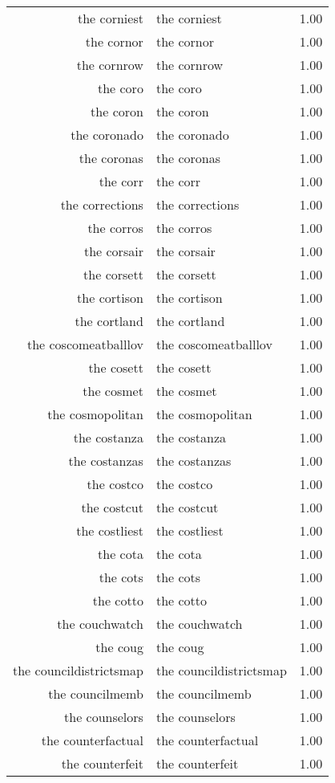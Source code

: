 \begin{table}[ht]
\begin{tabular}{rlr}
  the corniest & the corniest & 1.00 \\ 
  the cornor & the cornor & 1.00 \\ 
  the cornrow & the cornrow & 1.00 \\ 
  the coro & the coro & 1.00 \\ 
  the coron & the coron & 1.00 \\ 
  the coronado & the coronado & 1.00 \\ 
  the coronas & the coronas & 1.00 \\ 
  the corr & the corr & 1.00 \\ 
  the corrections & the corrections & 1.00 \\ 
  the corros & the corros & 1.00 \\ 
  the corsair & the corsair & 1.00 \\ 
  the corsett & the corsett & 1.00 \\ 
  the cortison & the cortison & 1.00 \\ 
  the cortland & the cortland & 1.00 \\ 
  the coscomeatballlov & the coscomeatballlov & 1.00 \\ 
  the cosett & the cosett & 1.00 \\ 
  the cosmet & the cosmet & 1.00 \\ 
  the cosmopolitan & the cosmopolitan & 1.00 \\ 
  the costanza & the costanza & 1.00 \\ 
  the costanzas & the costanzas & 1.00 \\ 
  the costco & the costco & 1.00 \\ 
  the costcut & the costcut & 1.00 \\ 
  the costliest & the costliest & 1.00 \\ 
  the cota & the cota & 1.00 \\ 
  the cots & the cots & 1.00 \\ 
  the cotto & the cotto & 1.00 \\ 
  the couchwatch & the couchwatch & 1.00 \\ 
  the coug & the coug & 1.00 \\ 
  the councildistrictsmap & the councildistrictsmap & 1.00 \\ 
  the councilmemb & the councilmemb & 1.00 \\ 
  the counselors & the counselors & 1.00 \\ 
  the counterfactual & the counterfactual & 1.00 \\ 
  the counterfeit & the counterfeit & 1.00 \\ 

\end{tabular}
\end{table}
